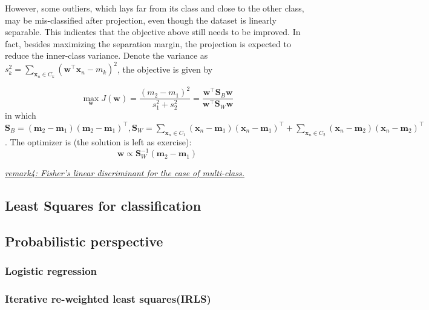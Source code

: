 \documentclass{article}
\begin{document}
	However, some outliers, which lays far from its class and close to the other class, may be mis-classified after projection, even though the dataset is linearly separable. This indicates that the objective above still needs to be improved. In fact, besides maximizing the separation margin, the projection is expected to reduce the inner-class variance. Denote the variance as $s_k^2=\sum_{\mathbf{x}_n\in C_k} (\mathbf{w}^\top\mathbf{x}_n-m_k)^2$, the objective is given by
	
	\begin{equation}
	\max_\mathbf{w} J(\mathbf{w}) = \frac{(m_2-m_1)^2}{s_1^2+s_2^2} 
	= \frac{\mathbf{w}^\top \mathbf{S}_B \mathbf{w}}{\mathbf{w}^\top \mathbf{S}_W \mathbf{w}}
	\end{equation}
in which $\mathbf{S}_B=(\mathbf{m}_2-\mathbf{m}_1)(\mathbf{m}_2-\mathbf{m}_1)^\top, \mathbf{S}_W=\sum_{\mathbf{x}_n\in C_1}(\mathbf{x}_n-\mathbf{m}_1)(\mathbf{x}_n-\mathbf{m}_1)^\top + \sum_{\mathbf{x}_n\in C_2}(\mathbf{x}_n-\mathbf{m}_2)(\mathbf{x}_n-\mathbf{m}_2)^\top$. The optimizer is (the solution is left as exercise):
	\begin{equation*}
	\mathbf{w}\propto \mathbf{S}_W^{-1} (\mathbf{m}_2-\mathbf{m}_1)
	\end{equation*}
	
	\begin{scriptsize}
	\begin{spacing}{1.2}
	{\sffamily \textit{\underline{remark4: Fisher's linear discriminant for the case of multi-class.}}}
	\end{spacing}
	\end{scriptsize}
	
	\subsection{Least Squares for classification}
	
	\subsection{Probabilistic perspective}
	
	\subsubsection{Logistic regression}
	
	\subsubsection{Iterative re-weighted least squares(IRLS)}
\end{document}
